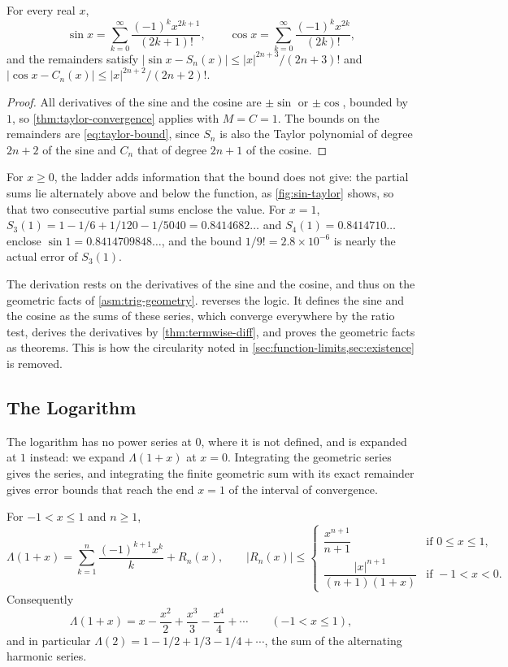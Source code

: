 \begin{theorem}
\label{thm:sin-cos-series}
For every real $x$,
\[
\sin x=\sum_{k=0}^\infty\frac{(-1)^kx^{2k+1}}{(2k+1)!},\qquad\cos x=\sum_{k=0}^\infty\frac{(-1)^kx^{2k}}{(2k)!},
\]
and the remainders satisfy $|\sin x-S_n(x)|\le|x|^{2n+3}/(2n+3)!$ and $|\cos x-C_n(x)|\le|x|^{2n+2}/(2n+2)!$.
\end{theorem}

\begin{proof}
All derivatives of the sine and the cosine are $\pm\sin$ or $\pm\cos$, bounded by $1$, so \cref{thm:taylor-convergence} applies with $M=C=1$. The bounds on the remainders are \eqref{eq:taylor-bound}, since $S_n$ is also the Taylor polynomial of degree $2n+2$ of the sine and $C_n$ that of degree $2n+1$ of the cosine.
\end{proof}

For $x\ge0$, the ladder adds information that the bound does not give: the partial sums lie alternately above and below the function, as \cref{fig:sin-taylor} shows, so that two consecutive partial sums enclose the value. For $x=1$, $S_3(1)=1-1/6+1/120-1/5040=0.8414682\ldots$ and $S_4(1)=0.8414710\ldots$ enclose $\sin1=0.8414709848\ldots$, and the bound $1/9!=2.8\times10^{-6}$ is nearly the actual error of $S_3(1)$.

The derivation rests on the derivatives of the sine and the cosine, and thus on the geometric facts of \cref{asm:trig-geometry}.  reverses the logic. It defines the sine and the cosine as the sums of these series, which converge everywhere by the ratio test, derives the derivatives by \cref{thm:termwise-diff}, and proves the geometric facts as theorems. This is how the circularity noted in \cref{sec:function-limits,sec:existence} is removed.

\subsection{The Logarithm}

The logarithm has no power series at $0$, where it is not defined, and is expanded at $1$ instead: we expand $\Lambda(1+x)$ at $x=0$. Integrating the geometric series gives the series, and integrating the finite geometric sum with its exact remainder gives error bounds that reach the end $x=1$ of the interval of convergence.

\begin{theorem}
\label{thm:log-series}
For $-1<x\le1$ and $n\ge1$,
\[
\Lambda(1+x)=\sum_{k=1}^n\frac{(-1)^{k+1}x^k}k+R_n(x),\qquad|R_n(x)|\le\begin{cases}\dfrac{x^{n+1}}{n+1}&\text{if }0\le x\le1,\\[2ex]\dfrac{|x|^{n+1}}{(n+1)(1+x)}&\text{if }-1<x<0.\end{cases}
\]
Consequently
\[
\Lambda(1+x)=x-\frac{x^2}2+\frac{x^3}3-\frac{x^4}4+\cdots\qquad(-1<x\le1),
\]
and in particular $\Lambda(2)=1-1/2+1/3-1/4+\cdots$, the sum of the alternating harmonic series.
\end{theorem}

